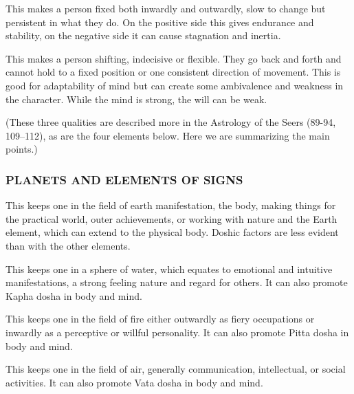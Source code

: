 


This makes a person fixed both inwardly and outwardly, slow to change but persistent in what they do. On the positive side this gives endurance and stability, on the negative side it can cause stagnation and inertia.

 


This makes a person shifting, indecisive or flexible. They go back and forth and cannot hold to a fixed position or one consistent direction of movement. This is good for adaptability of mind but can create some ambivalence and weakness in the character. While the mind is strong, the will can be weak.

(These three qualities are described more in the Astrology of the Seers (89-94, 109–112), as are the four elements below. Here we are summarizing the main points.)

 

\subsubsection{PLANETS AND ELEMENTS OF SIGNS}


This keeps one in the field of earth manifestation, the body, making things for the practical world, outer achievements, or working with nature and the Earth element, which can extend to the physical body. Doshic factors are less evident than with the other elements.

 


This keeps one in a sphere of water, which equates to emotional and intuitive manifestations, a strong feeling nature and regard for others. It can also promote Kapha dosha in body and mind.

 


This keeps one in the field of fire either outwardly as fiery occupations or inwardly as a perceptive or willful personality. It can also promote Pitta dosha in body and mind.

 


This keeps one in the field of air, generally communication, intellectual, or social activities. It can also promote Vata dosha in body and mind.

 